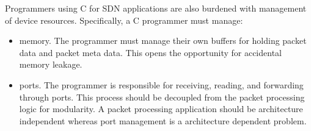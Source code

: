 Programmers using C for SDN applications are also burdened with management of
device resources. Specifically, a C programmer must manage:

\begin{itemize}
\item memory. The programmer must manage their own buffers for holding packet
data and packet meta data. This opens the opportunity for accidental
memory leakage.

\item ports. The programmer is responsible for receiving, reading, and
forwarding
through ports. This process should be decoupled from the packet processing logic
for modularity. A packet processing application should be architecture
independent
whereas port management is a architecture dependent problem.
\end{itemize}

%
%
%
%
%

